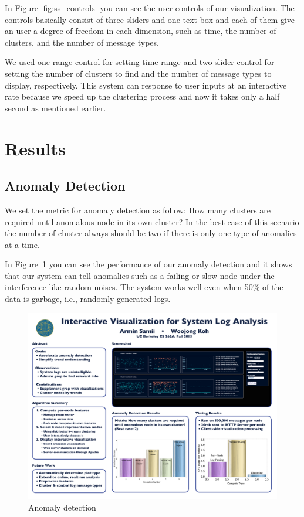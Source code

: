 \documentclass[conference]{style/acmsiggraph}
\begin{document}
In Figure \ref{fig:ss_controls} you can see the user controls of our visualization. The controls
basically consist of three sliders and one text box and each of them give an user a degree of
freedom in each dimension, such as time, the number of clusters, and the number of message types.

We used one range control for setting time range and two slider control for setting the number of
clusters to find and the number of message types to display, respectively. This system can response
to user inputs at an interactive rate because we speed up the clustering process and now it takes
only a half second as mentioned earlier.

\section{Results}

\subsection{Anomaly Detection}
We set the metric for anomaly detection as follow: How many clusters are required until anomalous
node in its own cluster? In the best case of this scenario the number of cluster always should be
two if there is only one type of anomalies at a time.

In Figure~\ref{fig:anomaly} you can see the performance of our anomaly detection and it shows that
our system can tell anomalies such as a failing or slow node under the interference like random
noises. The system works well even when 50\% of the data is garbage, i.e., randomly generated logs.

\begin{figure}[p]
    \centering
    \includegraphics[width=1.0\columnwidth]{images/anomaly.pdf}
    \caption{Anomaly detection}
    \label{fig:anomaly}
\end{figure}
\end{document}
